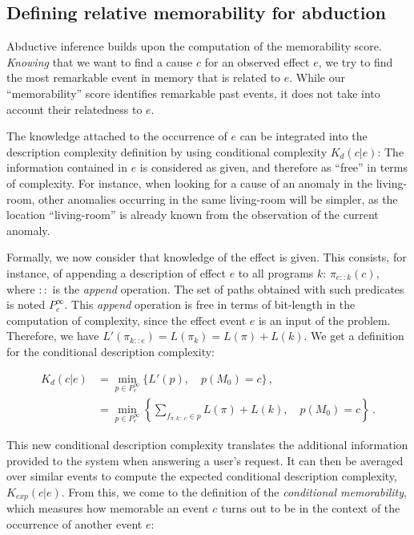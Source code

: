 \documentclass[entropy,article,submit,moreauthors,pdftex]{Definitions/mdpi}
\begin{document}
\subsection{Defining relative memorability for abduction}
Abductive inference builds upon the computation
of the memorability score. \emph{Knowing} that we want to find a cause $c$
for an observed effect $e$, we try to find the most remarkable event in
memory that is related to $e$. While our ``memorability'' score identifies remarkable past events, it does not take into account their relatedness to $e$.

The knowledge attached to the occurrence of $e$ can be integrated into the description complexity definition by using conditional complexity $K_d(c | e)$: The information contained in $e$ is considered as given, and therefore as ``free'' in terms of complexity. For instance, when looking for a cause of
an anomaly in the living-room, other anomalies occurring in the same
living-room will be simpler, as the location ``living-room'' is already known
from the observation of the current anomaly.

Formally, we now consider that knowledge of the effect is given. This consists, for instance, of appending a description of effect $e$  to all programs $k$:
$\pi_{e::k}(c)$, where $::$ is the \emph{append} operation. The set of paths obtained with such predicates is noted $P^\infty_e$. This \emph{append} operation is free in terms of bit-length in the computation of complexity, since the effect event $e$ is an input of the problem. Therefore, we have $L'(\pi_{k::e}) = L(\pi_k) = L(\pi) + L(k)$. We get a definition for the conditional description complexity:

\begin{align}
    \label{eq:abd_k}
    K_d(c | e) & = \min_{p \in P^\infty_e} \{L'(p), \quad p(M_0)=c \}\,,                                                \\
               & = \min_{p \in P^\infty_e} \left\{\sum_{f_{\pi, k::e} \in p} L(\pi) + L(k), \quad p(M_0) = c\right\}\,.
\end{align}

This new conditional description complexity translates the additional information provided to the
system when answering a user's request. It can then be averaged over similar events to compute the expected conditional description complexity, $K_{exp}(c|e)$. From this, we come to the definition of the \emph{conditional memorability}, which measures how memorable an event $c$ turns out to be in the context of the occurrence of another event $e$:
\end{document}
